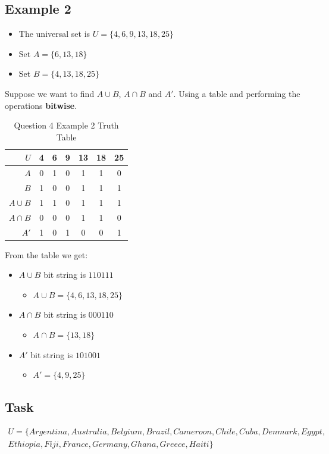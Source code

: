 \documentclass[12pt,a4paper]{article}
\begin{document}
\subsection{Example 2}

\begin{itemize}
\item The universal set is $U = \{4, 6, 9, 13, 18, 25\}$
\item Set $A = \{6, 13, 18\}$
\item Set $B = \{4, 13, 18, 25\}$
\end{itemize}
Suppose we want to find $A \cup B$, $A \cap B$ and $A'$. Using a table and performing the operations \textbf{bitwise}.

\begin{table}[h]
\centering
\caption{Question 4 Example 2 Truth Table}
\begin{tabular}{r|c|c|c|c|c|c}
$U$ & 4 & 6 & 9 & 13 & 18 & 25 \\
\hline
$A$ & 0 & 1 & 0 & 1 & 1 & 0 \\
\hline
$B$ & 1 & 0 & 0 & 1 & 1 & 1 \\
\hline
$A \cup B$ & 1 & 1 & 0 & 1 & 1 & 1 \\
\hline
$A \cap B$ & 0 & 0 & 0 & 1 & 1 & 0 \\
\hline
$A'$ & 1 & 0 & 1 & 0 & 0 & 1 \\
\end{tabular}
\end{table}
From the table we get:
\begin{itemize}
\item $A \cup B$ bit string is $110111$
	\begin{itemize}
	\item $A \cup B = \{4, 6, 13, 18, 25\}$
	\end{itemize}
\item $A \cap B$ bit string is $000110$
	\begin{itemize}
	\item $A \cap B = \{13, 18\}$
	\end{itemize}
\item $A'$ bit string is $101001$
	\begin{itemize}
	\item $A' = \{4, 9, 25\}$
	\end{itemize}
\end{itemize}

\subsection{Task}
\begin{gather*}
U = \{Argentina, Australia, Belgium, Brazil, Cameroon, Chile, Cuba, Denmark, Egypt, 
\\Ethiopia, Fiji, France, Germany, Ghana, Greece, Haiti\}
\end{gather*}
\end{document}
